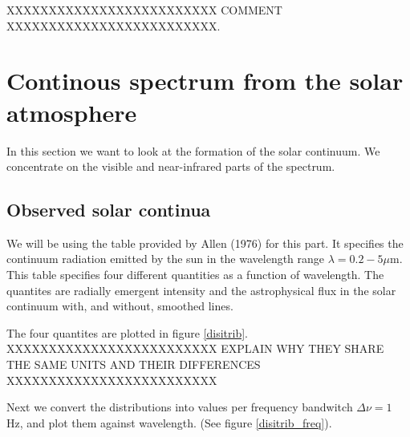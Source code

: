 \documentclass{aa}   %
\begin{document}
XXXXXXXXXXXXXXXXXXXXXXXXX COMMENT XXXXXXXXXXXXXXXXXXXXXXXXX.

\section{Continous spectrum from the solar atmosphere}
In this section we want to look at the formation of the solar continuum. We concentrate on the visible and near-infrared parts of the spectrum.
\subsection{Observed solar continua}
We will be using the table provided by Allen (1976) for this part. It specifies the continuum radiation emitted by the sun in the wavelength range $\lambda = 0.2 - 5\mu$m. This table specifies four different quantities as a function of wavelength. The quantites are radially emergent intensity and the astrophysical flux in the solar continuum with, and without, smoothed lines.

The four quantites are plotted in figure \ref{disitrib}.
XXXXXXXXXXXXXXXXXXXXXXXXX EXPLAIN WHY THEY SHARE THE SAME UNITS AND THEIR DIFFERENCES   XXXXXXXXXXXXXXXXXXXXXXXXX

Next we convert the distributions into values per frequency bandwitch $\Delta \nu = 1$ Hz, and plot them against wavelength. (See figure \ref{disitrib_freq}).
\end{document}
